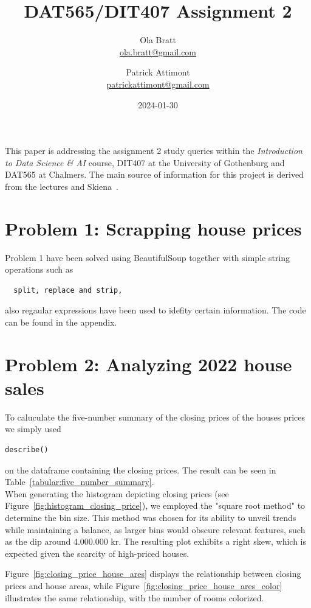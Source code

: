 \documentclass[a4paper]{article}
\begin{document}
\author{Ola Bratt \\
  \href{mailto:ola.bratt@gmail.com}{ola.bratt@gmail.com}
  \and
  Patrick Attimont \\
  \href{patrickattimont@gmail.com}{patrickattimont@gmail.com}
}

\title{DAT565/DIT407 Assignment 2}
\date{2024-01-30}

\maketitle

This paper is addressing the assignment 2 study queries within the \emph{Introduction to Data Science \& AI} course, DIT407 at 
the University of Gothenburg and DAT565 at Chalmers. The main source of information for this project
is derived from the lectures and Skiena~\cite{Skiena:2024}. 
\section*{Problem 1: Scrapping house prices}
Problem 1 have been solved using BeautifulSoup together with simple string operations such as 
\begin{verbatim}
  split, replace and strip, 
\end{verbatim}
also regaular expressions have been used to idefity certain information. The code can be found in the appendix.

\section*{Problem 2: Analyzing 2022 house sales}
To caluculate the five-number summary of the closing prices of the houses prices we simply used 
\begin{verbatim}
describe()
\end{verbatim}
on the dataframe containing the closing prices. The result can be seen in Table~\ref{tabular:five_number_summary}.\\

When generating the histogram depicting closing prices (see Figure~\ref{fig:histogram_closing_price}), we employed the "square root method" to determine the bin size. This method was chosen for its ability to unveil trends while maintaining a balance, as larger bins would obscure relevant features, such as the dip around 4.000.000 kr. The resulting plot exhibits a right skew, which is expected given the scarcity of high-priced houses.

Figure~\ref{fig:closing_price_house_ares} displays the relationship between closing prices and house areas, while Figure~\ref{fig:closing_price_house_ares_color} illustrates the same relationship, with the number of rooms colorized.
\end{document}
